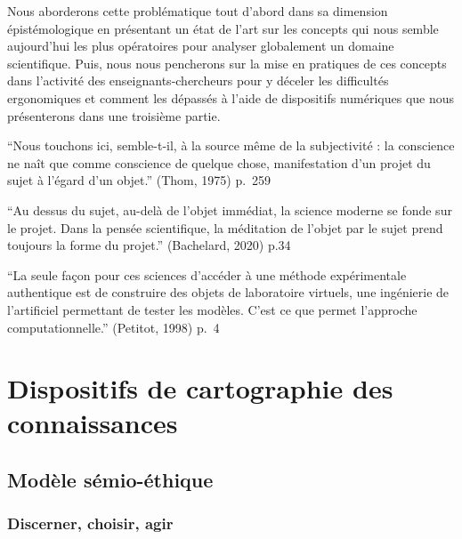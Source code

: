 \documentclass[
  letterpaper,
  DIV=11,
  numbers=noendperiod]{scrreprt}
\begin{document}
Nous aborderons cette problématique tout d'abord dans sa dimension
épistémologique en présentant un état de l'art sur les concepts qui nous
semble aujourd'hui les plus opératoires pour analyser globalement un
domaine scientifique. Puis, nous nous pencherons sur la mise en
pratiques de ces concepts dans l'activité des enseignants-chercheurs
pour y déceler les difficultés ergonomiques et comment les dépassés à
l'aide de dispositifs numériques que nous présenterons dans une
troisième partie.

``Nous touchons ici, semble-t-il, à la source même de la subjectivité :
la conscience ne naît que comme conscience de quelque chose,
manifestation d'un projet du sujet à l'égard d'un objet.'' (Thom, 1975)
p.~259

``Au dessus du sujet, au-delà de l'objet immédiat, la science moderne se
fonde sur le projet. Dans la pensée scientifique, la méditation de
l'objet par le sujet prend toujours la forme du projet.'' (Bachelard,
2020) p.34

``La seule façon pour ces sciences d'accéder à une méthode expérimentale
authentique est de construire des objets de laboratoire virtuels, une
ingénierie de l'artificiel permettant de tester les modèles. C'est ce
que permet l'approche computationnelle.'' (Petitot, 1998) p.~4

\hypertarget{dispositifs-de-cartographie-des-connaissances}{%
\section*{Dispositifs de cartographie des
connaissances}\label{dispositifs-de-cartographie-des-connaissances}}


\hypertarget{moduxe8le-suxe9mio-uxe9thique}{%
\subsection*{Modèle sémio-éthique}\label{moduxe8le-suxe9mio-uxe9thique}}

\hypertarget{discerner-choisir-agir}{%
\subsubsection*{Discerner, choisir, agir}\label{discerner-choisir-agir}}
\end{document}

